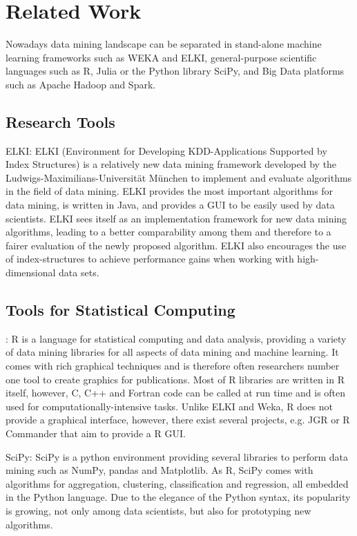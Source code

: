 \chapter{Related Work}\label{chapter:related}

Nowadays data mining landscape can be separated in stand-alone machine learning frameworks such as WEKA and ELKI, general-purpose scientific languages such as R, Julia or the Python library SciPy, and Big Data platforms such as Apache Hadoop and Spark.

\section{Research Tools}


ELKI: ELKI (Environment for Developing KDD-Applications Supported by Index Structures) is a relatively new data mining framework developed by the Ludwigs-Maximilians-Universität München to implement and evaluate algorithms in the field of data mining. ELKI provides the most important algorithms for data mining, is written in Java, and provides a GUI to be easily used by data scientists.  ELKI sees itself as an implementation framework for new data mining algorithms, leading to a better comparability among them and therefore to a fairer evaluation of the newly proposed algorithm. ELKI also encourages the use of index-structures to achieve performance gains when working with high-dimensional data sets.

\section{Tools for Statistical Computing}

: R is a language for statistical computing and data analysis, providing a variety of data mining libraries for all aspects of data mining and machine learning. It comes with rich graphical techniques and is therefore often researchers number one tool to create graphics for publications. Most of R libraries are written in R itself, however, C, C++ and Fortran code can be called at run time and is often used for computationally-intensive tasks. Unlike ELKI and Weka, R does not provide a graphical interface, however, there exist several projects, e.g. JGR or R Commander that aim to provide a R GUI.


SciPy: SciPy is a python environment providing several libraries to perform data mining such as NumPy, pandas and Matplotlib. As R, SciPy comes with algorithms for aggregation, clustering, classification and regression, all embedded in the Python language. Due to the elegance of the Python syntax, its popularity is growing, not only among data scientists, but also for prototyping new algorithms.

